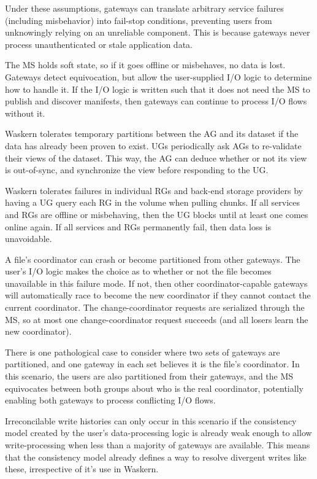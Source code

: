 Under these assumptions, gateways can translate arbitrary service failures
(including misbehavior) into fail-stop conditions, preventing users from
unknowingly relying on an unreliable component.  This is because gateways never
process unauthenticated or stale application data.

The MS holds soft state, so if it goes offline or misbehaves, no data is lost.
Gateways detect equivocation, but allow the
user-supplied I/O logic to determine how to handle it.  If the I/O logic is written such that it does not
need the MS to publish and discover manifests, then gateways can
continue to process I/O flows without it.

Waskern tolerates temporary partitions between the AG and its dataset
if the data has already been proven to exist. UGs periodically ask AGs
to re-validate their views of the dataset.
This way, the AG can deduce whether or not its view is out-of-sync, and
synchronize the view before responding to the UG.

Waskern tolerates failures in individual RGs and back-end storage providers by
having a UG query each RG in the volume when pulling chunks.  If all services
and RGs are offline or misbehaving, then the UG blocks until
at least one comes online again. If all services and RGs permanently fail, then data loss is
unavoidable.

A file's coordinator can crash or become partitioned from other gateways.
The user's I/O logic makes the choice as to whether or not the file becomes unavailable
in this failure mode.  If not, then other coordinator-capable gateways will
automatically race to become the new coordinator if they cannot contact
the current coordinator.  The change-coordinator requests are serialized
through the MS, so at most one change-coordinator request succeeds (and all
losers learn the new coordinator).

There is one pathological case to consider where two sets of gateways are
partitioned, and one gateway in each set believes it is the file's coordinator.
In this scenario, the users are also partitioned from their gateways, and the MS
equivocates between both groups about who is the real coordinator, potentially
enabling both gateways to process conflicting I/O flows.

Irreconcilable write histories can only occur in this scenario if the consistency model
created by the user's data-processing logic is already weak enough to allow 
write-processing when less than a majority of gateways are available.
This means that the consistency model already defines a way to resolve divergent
writes like these, irrespective of it's use in Waskern.

